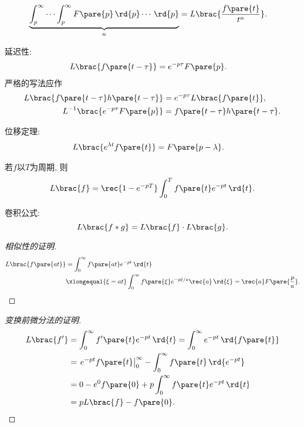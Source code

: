 \documentclass[../ComplexVariable.tex]{subfiles}
\begin{document}
\begin{finale}
\begin{theorem}[Laplace变换的性质]
\begin{cenum}
\begin{cenum}
\begin{align*}
                \underbrace{\int_p^\infty \cdots \int_p^\infty F\pare{p}\,\rd{p}\cdots \,\rd{p}}_{n} &= L\brac{\frac{f\pare{t}}{t^n}}.
            \end{align*}
        \end{cenum}
        \item 延迟性:
        \begin{align*}
            L\brac{f\pare{t-\tau}} &= e^{-p\tau} F\pare{p}.
        \end{align*}
        严格的写法应作
        \begin{align*}
            L\brac{f\pare{t-\tau}h\pare{t-\tau}} &= e^{-p\tau}L\brac{f\pare{t}}, \\
            L^{-1}\brac{e^{-p\tau}F\pare{p}} &= f\pare{t-\tau} h\pare{t-\tau}.
        \end{align*}
        \item 位移定理:
        \begin{align*}
            L\brac{e^{\lambda t}f\pare{t}} &= F\pare{p-\lambda}.
        \end{align*}
        \item 若$f$以$T$为周期, 则
        \[ L\brac{f} = \rec{1-e^{-pT}} \int_0^T f\pare{t}e^{-pt}\,\rd{t}. \]
        \item 卷积公式:
        \[ L\brac{f*g} = L\brac{f}\cdot L\brac{g}. \]
    \end{cenum}
\end{theorem}
\end{finale}
\begin{proof}[相似性的证明]
    \begin{align*}
        L\brac{f\pare{at}} &= \int_0^\infty f\pare{at}e^{-pt}\,\rd{t} \\
        &\xlongequal{\xi = at} \int_0^\infty f\pare{\xi} e^{-p\xi /a}\rec{a}\,\rd{\xi} = \rec{a}F\pare{\frac{p}{a}}. \qedhere
    \end{align*}
\end{proof}
\begin{proof}[变换前微分法的证明]
    \begin{align*}
        L\brac{f'} &= \int_0^\infty f'\pare{t} e^{-pt}\,\rd{t} = \int_0^\infty e^{-pt}\,\rd{f\pare{t}} \\
        &= \left. e^{-pt}f\pare{t}\right\vert_0^\infty - \int_0^\infty f\pare{t}\,\rd{e^{-pt}} \\
        &= 0 - e^0 f\pare{0} + p\int_0^\infty f\pare{t} e^{-pt}\,\rd{t} \\
        &= pL\brac{f} - f\pare{0}. \qedhere
    \end{align*}
\end{proof}
\end{document}
